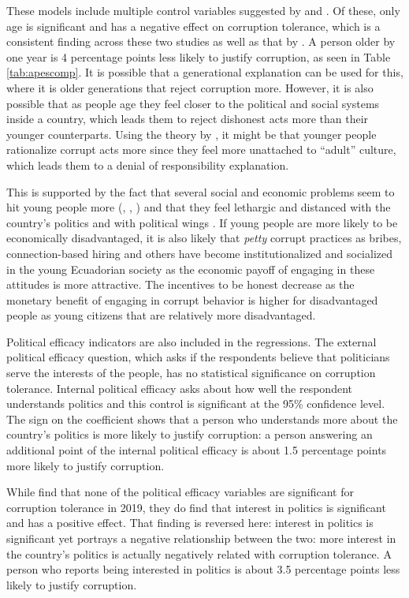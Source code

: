 \documentclass[12pt,a4]{article}\usepackage[]{graphicx}\usepackage[]{xcolor}
\begin{document}
These models include multiple control variables suggested by \textcite{Moscoso.2020} and \textcite{Lupu.2017}. Of these, only age is significant and has a negative effect on corruption tolerance, which is a consistent finding across these two studies as well as that by \textcite{Montalvo.2019}. A person older by one year is 4 percentage points less likely to justify corruption, as seen in Table \ref{tab:apescomp}. It is possible that a generational explanation can be used for this, where it is older generations that reject corruption more. However, it is also possible that as people age they feel closer to the political and social systems inside a country, which leads them to reject dishonest acts more than their younger counterparts. Using the theory by \textcite{Ashforth.2003}, it might be that younger people rationalize corrupt acts more since they feel more unattached to \enquote{adult} culture, which leads them to a denial of responsibility explanation. 

This is supported by the fact that several social and economic problems seem to hit young people more (\cite{Vasconez.2016}, \cite{Crespo.2019}, \cite{Cetrangolo.2020}) and that they feel lethargic and distanced with the country's politics and with political wings \parencite{Lucero.2020}. If young people are more likely to be economically disadvantaged, it is also likely that \textit{petty} corrupt practices as bribes, connection-based hiring and others have become institutionalized and socialized in the young Ecuadorian society as the economic payoff of engaging in these attitudes is more attractive. The incentives to be honest decrease as the monetary benefit of engaging in corrupt behavior is higher for disadvantaged people as young citizens that are relatively more disadvantaged. 

Political efficacy indicators are also included in the regressions. The external political efficacy question, which asks if the respondents believe that politicians serve the interests of the people, has no statistical significance on corruption tolerance. Internal political efficacy asks about how well the respondent understands politics and this control is significant at the 95\% confidence level. The sign on the coefficient shows that a person who understands more about the country's politics is more likely to justify corruption: a person answering an additional point of the internal political efficacy is about 1.5 percentage points more likely to justify corruption.

While \textcite{Moscoso.2020} find that none of the political efficacy variables are significant for corruption tolerance in 2019, they do find that interest in politics is significant and has a positive effect. That finding is reversed here: interest in politics is significant yet portrays a negative relationship between the two: more interest in the country's politics is actually negatively related with corruption tolerance. A person who reports being interested in politics is about 3.5 percentage points less likely to justify corruption. 
\end{document}
